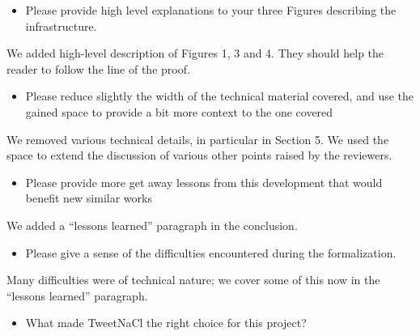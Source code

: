 \begin{answer}
\end{answer}

\begin{center}
\end{center}
\begin{itemize}
  \item Please provide high level explanations to your three Figures describing the infrastructure.
\end{itemize}
\begin{answer}
  We added high-level description of Figures 1, 3 and 4. They should help the reader to follow the line of the proof.
\end{answer}
\begin{itemize}
  \item Please reduce slightly the width of the technical material covered, and use the gained space to provide a bit more context to the one covered
\end{itemize}
\begin{answer}
  We removed various technical details, in particular in Section 5. We used the space to extend the discussion
  of various other points raised by the reviewers.
\end{answer}
\begin{itemize}
  \item Please provide more get away lessons from this development that would benefit new similar works
\end{itemize}
\begin{answer}
  We added a ``lessons learned'' paragraph in the conclusion.
\end{answer}
\begin{itemize}
  \item Please give a sense of the difficulties encountered during the formalization.
\end{itemize}
\begin{answer}
  Many difficulties were of technical nature; we cover some of this now in the ``lessons learned'' paragraph.
\end{answer}

\begin{center}
\end{center}

\begin{itemize}
  \item What made TweetNaCl the right choice for this project?
\end{itemize}

